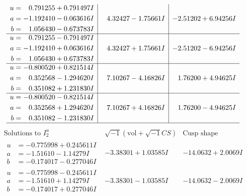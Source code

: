 \documentclass[1p]{elsarticle_modified}
\theoremstyle{definition}
\newcommand{\I}{\sqrt{-1}}
\begin{document}
$$\begin{array}{c|c|c}
\begin{aligned}
u &= \phantom{-}0.791255 + 0.791497 I \\
a &= -1.192410 - 0.063616 I \\
b &= \phantom{-}1.056430 - 0.673783 I\end{aligned}
 & \phantom{-}4.32427 - 1.75661 I & -2.51202 + 6.94256 I \\ \hline\begin{aligned}
u &= \phantom{-}0.791255 - 0.791497 I \\
a &= -1.192410 + 0.063616 I \\
b &= \phantom{-}1.056430 + 0.673783 I\end{aligned}
 & \phantom{-}4.32427 + 1.75661 I & -2.51202 - 6.94256 I \\ \hline\begin{aligned}
u &= -0.800520 + 0.821514 I \\
a &= \phantom{-}0.352568 - 1.294620 I \\
b &= \phantom{-}0.351082 + 1.231830 I\end{aligned}
 & \phantom{-}7.10267 - 4.16826 I & \phantom{-}1.76200 + 4.94625 I \\ \hline\begin{aligned}
u &= -0.800520 - 0.821514 I \\
a &= \phantom{-}0.352568 + 1.294620 I \\
b &= \phantom{-}0.351082 - 1.231830 I\end{aligned}
 & \phantom{-}7.10267 + 4.16826 I & \phantom{-}1.76200 - 4.94625 I\\
 \hline 
 \end{array}$$\newpage$$\begin{array}{c|c|c}  
\text{Solutions to }I^u_{2}& \I (\text{vol} + \sqrt{-1}CS) & \text{Cusp shape}\\
 \hline 
\begin{aligned}
u &= -0.775998 + 0.245611 I \\
a &= -1.51610 - 1.14279 I \\
b &= -0.174017 - 0.277046 I\end{aligned}
 & -3.38301 + 1.03585 I & -14.0632 + 2.0069 I \\ \hline\begin{aligned}
u &= -0.775998 - 0.245611 I \\
a &= -1.51610 + 1.14279 I \\
b &= -0.174017 + 0.277046 I\end{aligned}
 & -3.38301 - 1.03585 I & -14.0632 - 2.0069 I \\ \hline\begin{aligned}

\end{aligned}
\end{array}$$
\end{document}
